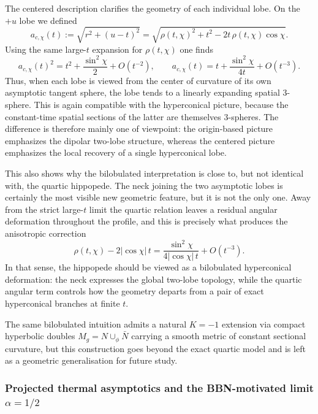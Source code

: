 \documentclass[3p,times,twocolumn]{elsarticle}
\begin{document}
The centered description clarifies the geometry of each individual lobe. On the $+u$ lobe we defined
\begin{equation}
a_{c,\chi}(t):=\sqrt{r^2+(u-t)^2}
=\sqrt{\rho(t,\chi)^2+t^2-2t\,\rho(t,\chi)\cos\chi}.
\end{equation}
Using the same large-$t$ expansion for $\rho(t,\chi)$ one finds
\begin{equation}
a_{c,\chi}(t)^2
=t^2+\frac{\sin^2\chi}{2}+O(t^{-2}),
\qquad
a_{c,\chi}(t)
=t+\frac{\sin^2\chi}{4t}+O(t^{-3}).
\end{equation}
Thus, when each lobe is viewed from the center of curvature of its own asymptotic tangent sphere, the lobe tends to a linearly expanding spatial $3$-sphere. This is again compatible with the hyperconical picture, because the constant-time spatial sections of the latter are themselves $3$-spheres. The difference is therefore mainly one of viewpoint: the origin-based picture emphasizes the dipolar two-lobe structure, whereas the centered picture emphasizes the local recovery of a single hyperconical lobe.

This also shows why the bilobulated interpretation is close to, but not identical with, the quartic hippopede. The neck joining the two asymptotic lobes is certainly the most visible new geometric feature, but it is not the only one. Away from the strict large-$t$ limit the quartic relation leaves a residual angular deformation throughout the profile, and this is precisely what produces the anisotropic correction
\begin{equation}
\rho(t,\chi)-2|{\cos\chi}|\,t
=\frac{\sin^2\chi}{4|{\cos\chi}|\,t}+O(t^{-3}).
\end{equation}
In that sense, the hippopede should be viewed as a bilobulated hyperconical deformation: the neck expresses the global two-lobe topology, while the quartic angular term controls how the geometry departs from a pair of exact hyperconical branches at finite $t$.

The same bilobulated intuition admits a natural $K=-1$ extension via compact hyperbolic doubles $M_g = N\cup_\phi\bar N$ carrying a smooth metric of constant sectional curvature, but this construction goes beyond the exact quartic model and is left as a geometric generalisation for future study.


\subsubsection*{Projected thermal asymptotics and the BBN-motivated limit $\alpha=1/2$}
\end{document}
